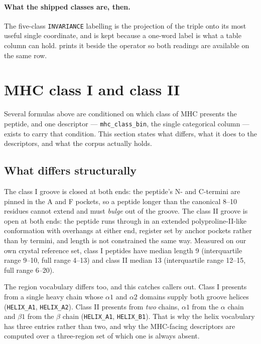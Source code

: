 \documentclass[11pt,a4paper]{article}
\newcommand{\dsc}[1]{\texttt{#1}}
\begin{document}
\paragraph{What the shipped classes are, then.} The five-class \texttt{INVARIANCE} labelling is the
projection of the triple onto its most useful single coordinate, and is kept because a one-word
label is what a table column can hold.  prints it beside the operator so both
readings are available on the same row.

\section{MHC class I and class II}
\label{sec:classes}

Several formulas above are conditioned on which class of MHC presents the peptide, and one
descriptor --- \dsc{mhc\_class\_bin}, the single categorical column --- exists to carry that
condition. This section states what differs, what it does to the descriptors, and what the corpus
actually holds.

\subsection{What differs structurally}

The class I groove is closed at both ends: the peptide's N- and C-termini are pinned in the A and F
pockets, so a peptide longer than the canonical 8--10 residues cannot extend and must \emph{bulge}
out of the groove. The class II groove is open at both ends: the peptide runs through in an extended
polyproline-II-like conformation with overhangs at either end, register set by anchor pockets rather
than by termini, and length is not constrained the same way. Measured on our own crystal reference
set, class I peptides have median length 9 (interquartile range 9--10, full range 4--13) and class II
median 13 (interquartile range 12--15, full range 6--20).

The region vocabulary differs too, and this catches callers out. Class I presents from a single
heavy chain whose $\alpha1$ and $\alpha2$ domains supply both groove helices
(\texttt{HELIX\_A1}, \texttt{HELIX\_A2}). Class II presents from \emph{two} chains, $\alpha1$ from
the $\alpha$ chain and $\beta1$ from the $\beta$ chain (\texttt{HELIX\_A1}, \texttt{HELIX\_B1}).
That is why the helix vocabulary has three entries rather than two, and why the MHC-facing
descriptors are computed over a three-region set of which one is always absent.
\end{document}

